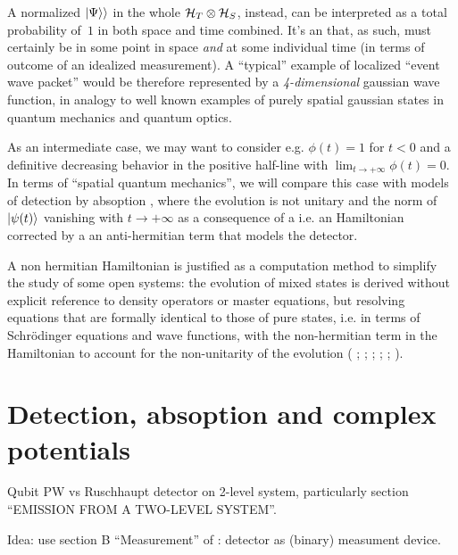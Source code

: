 A normalized $|\Psi\rangle\rangle$ in the whole $\mathcal{H}_T \otimes \mathcal{H}_S$,
instead,
can be interpreted as a total probability of~$1$ in both space and time combined.
It's an  that, as such, must certainly be in some point in space
\emph{and} at some individual time (in terms of outcome of an idealized measurement).
A ``typical'' example of localized ``event wave packet'' would be
therefore represented by
a \emph{4-dimensional} gaussian wave function,
in analogy to well known examples of purely spatial gaussian states
in quantum mechanics and quantum optics.

As an intermediate case, we may want to consider e.g.
$\phi(t) = 1$ for $t < 0 $ and a definitive decreasing behavior
in the positive half-line with $\lim_{t \to +\infty} \phi(t) = 0$.
In terms of ``spatial quantum mechanics'', we will compare this case with
models of detection by absoption \parencite{RuschhauptAbsorption},
where the evolution is not unitary and
the norm of $\ket{\psi(t)}$ vanishing with $t \to +\infty$
as a consequence of a 
i.e.
an Hamiltonian corrected by a an anti-hermitian term
that models the detector.

A non hermitian Hamiltonian is justified as a computation method
to simplify the study of some open systems: the evolution of mixed
states is derived without explicit reference to density operators
or master equations, but resolving equations that are formally
identical to those of pure states,
i.e. in terms of
Schr{\"o}dinger equations and wave functions,
with the non-hermitian term in the Hamiltonian
to account for the non-unitarity of the evolution
(%
  \cite[Ch. 6]{TQM2};
  \cite{Wave-function_approach};
  \cite{HowToResetAnAtom};
  \cite{TheQuantumJumpApproach};
  \cite[\S 8.5 ``The `quantum jump' approach to damping'' and particularly \S 8.5.2 ``The wave function Monte Carlo approach to damping'']{ScullyZubairy};
  \cite[particularly \S 6.7.1 ``Simulating Quantum Trajectories'']{WallsMilburn}%
).

\section{Detection, absoption and complex potentials}

Qubit PW vs Ruschhaupt detector on 2-level system,
particularly section “EMISSION FROM A TWO-LEVEL SYSTEM”.

Idea: use section B ``Measurement'' of \cite{Lloyd:Time}: detector as (binary) measument device.

